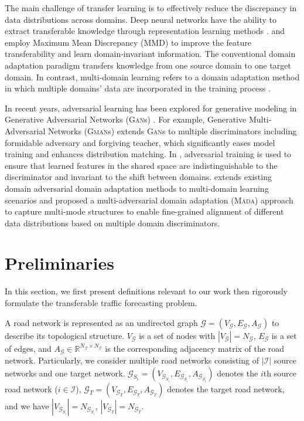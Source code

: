 \documentclass[sigconf]{acmart}
\theoremstyle{definition}
\begin{document}
The main challenge of transfer learning is to effectively reduce the discrepancy in data distributions across domains. Deep neural networks have the ability to extract transferable knowledge through representation learning methods \cite{yosinski2014transferable}. 
\cite{long2015learning} and \cite{long2018transferable} employ Maximum Mean Discrepancy (MMD) to improve the feature transferability and learn domain-invariant information. The conventional domain adaptation paradigm transfers knowledge from one source domain to one target domain. In contrast, multi-domain learning refers to a domain adaptation method in which multiple domains' data are incorporated in the training process \cite{nam2016learning,yang2014unified}. 

In recent years, adversarial learning has been explored for generative modeling in Generative Adversarial Networks (\textsc{Gan}s) \cite{goodfellow2014generative}. For example, Generative Multi-Adversarial Networks (\textsc{Gman}s) \cite{durugkar2016generative} extends \textsc{Gan}s to multiple discriminators including formidable adversary and forgiving teacher, which significantly eases model training and enhances distribution matching. In \cite{ganin2015unsupervised}, adversarial training is used to ensure that learned features in the shared space are indistinguishable to the discriminator and invariant to the shift between domains. \cite{pei2018multi} extends existing domain adversarial domain adaptation methods to multi-domain learning scenarios and proposed a multi-adversarial domain adaptation (\textsc{Mada}) approach to capture multi-mode structures to enable fine-grained alignment of different data distributions based on multiple domain discriminators.

\section{Preliminaries}\label{sec:preliminaries}

In this section, we first present definitions relevant to our work then rigorously formulate the transferable traffic forecasting problem.

\begin{definition}
A road network is represented as an undirected graph $\mathcal{G}=(V_{\mathcal{G}}, E_{\mathcal{G}}, A_{\mathcal{G}})$ to describe its topological structure. $V_{\mathcal{G}}$ is a set of nodes with $|V_{\mathcal{G}}|=N_{\mathcal{G}}$, $E_\mathcal{G}$ is a set of edges, and $A_{\mathcal{G}} \in \mathbb{R}^{N_{\mathcal{G}} \times N_{\mathcal{G}}}$ is the corresponding adjacency matrix of the road network. Particularly, we consider multiple road networks consisting of $|\mathcal{I}|$ source networks and one target network. $\mathcal{G}_{S_{i}}=(V_{\mathcal{G}_{S_i}}, E_{\mathcal{G}_{S_i}}, A_{\mathcal{G}_{S_i}})$ denotes the $i$th source road network ($i \in \mathcal{I}$), $\mathcal{G}_{T}=(V_{\mathcal{G}_{T}}, E_{\mathcal{G}_{T}}, A_{\mathcal{G}_{T}})$ denotes the target road network, and we have $|V_{\mathcal{G}_{S_i}}|=N_{\mathcal{G}_{S_i}}$, $|V_{\mathcal{G}_{T}}|=N_{\mathcal{G}_{T}}$. 
\end{definition}
\end{document}
